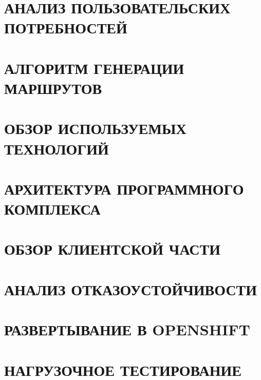 \documentclass[a4paper,14pt,russian]{extreport}
\begin{document}
    
    
    \tableofcontents
    
    \newpage
    
    
    \chapter{АНАЛИЗ ПОЛЬЗОВАТЕЛЬСКИХ ПОТРЕБНОСТЕЙ}
    
    
    \chapter{АЛГОРИТМ ГЕНЕРАЦИИ МАРШРУТОВ}
    
    
    \chapter{ОБЗОР ИСПОЛЬЗУЕМЫХ ТЕХНОЛОГИЙ}
    
    
    \chapter{АРХИТЕКТУРА ПРОГРАММНОГО КОМПЛЕКСА}
    
    
    \chapter{ОБЗОР КЛИЕНТСКОЙ ЧАСТИ}
    
    
    \chapter{АНАЛИЗ ОТКАЗОУСТОЙЧИВОСТИ}
    
    
    \chapter{РАЗВЕРТЫВАНИЕ В OPENSHIFT}
    
    
    \chapter{НАГРУЗОЧНОЕ ТЕСТИРОВАНИЕ}
    
    
    \newpage
    
    
    \newpage
    
    
    \newpage
    \listoffigures
    \newpage
    \listoftables
    \newpage
    \listoflistings
\end{document}

